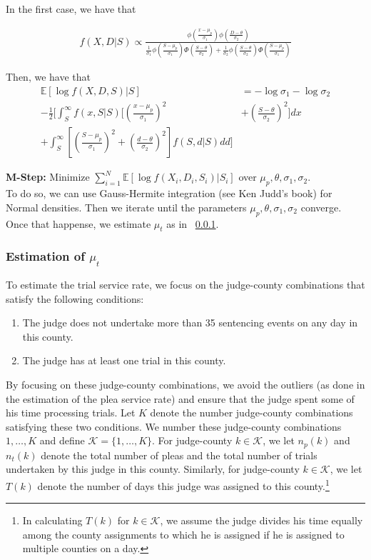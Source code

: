 \documentclass[11pt, oneside]{article}   	%
\theoremstyle{ModifiedStyle}
\begin{document}
In the first case, we have that

\begin{align}
	f(X,D|S) \propto \frac{\phi(\frac{x-\mu_p}{\sigma_1}) \phi(\frac{D-\theta}{\sigma_2})}{\frac{1}{\sigma_1} \phi(\frac{S-\mu_p}{\sigma_1}) \Phi(\frac{S-\theta}{\sigma_2}) + \frac{1}{\sigma_2} \phi(\frac{S-\theta}{\sigma_2}) \Phi(\frac{S-\mu_p}{\sigma_1})}
\end{align}

Then, we have that
\begin{align*}
	\mathbb{E}[\log f(X,D,S) | S] &= -\log \sigma_1 - \log \sigma_2 \\
	-\frac{1}{2}[\int_S^\infty f(x,S|S)[(\frac{x-\mu_p}{\sigma_1})^2 &+ (\frac{S-\theta}{\sigma_2})^2]dx \\
	+ \int_S^\infty [(\frac{S-\mu_p}{\sigma_1})^2 + (\frac{d-\theta}{\sigma_2})^2]f(S,d|S) dd]
\end{align*}

\noindent \textbf{M-Step:} Minimize $\sum_{i=1}^N \mathbb{E}[\log f(X_i,D_i,S_i)|S_i]$ over $\mu_p,\theta,\sigma_1,\sigma_2$. \\
To do so, we can use Gauss-Hermite integration (see Ken Judd's book) for Normal densities. Then we iterate until the parameters $\mu_p,\theta,\sigma_1,\sigma_2$ converge. Once that happense, we estimate $\mu_t$ as in ~\ref{mu_t-estimation}.

\subsubsection{Estimation of $\mu_t$}
\label{mu_t-estimation}
To estimate the trial service rate, we focus on the judge-county combinations that satisfy the following conditions:
\begin{enumerate}[label=(\roman*)]
	\vspace{-2mm}
	\item The judge does not undertake more than 35 sentencing events on any day in this county.
	\item The judge has at least one trial in this county.
\end{enumerate}
\vspace{-1mm}
By focusing on these judge-county combinations, we avoid the outliers (as done in the estimation of the plea service rate) and ensure that the judge spent some of his time processing trials. Let $K$ denote the number judge-county combinations satisfying these two conditions. We number these judge-county combinations $1,\ldots,K$ and define $\mathcal{K} = \{1,\ldots,K\}$. For judge-county $k \in \mathcal{K}$, we let $n_p(k)$ and $n_t(k)$ denote the total number of pleas and the total number of trials undertaken by this judge in this county. Similarly, for judge-county $k \in \mathcal{K}$, we let $T(k)$ denote the number of days this judge was assigned to this county.\footnote{In calculating $T(k)$ for $k\in\mathcal{K}$, we assume the judge divides his time equally among the county assignments to which he is assigned if he is assigned to multiple counties on a day.}
\end{document}
